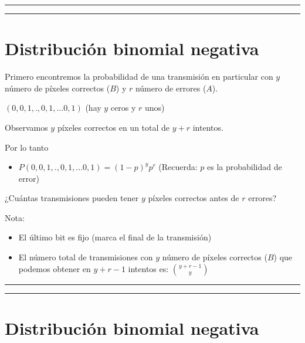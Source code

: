 \documentclass[
]{book}
\providecommand{\tightlist}{%
  \setlength{\itemsep}{0pt}\setlength{\parskip}{0pt}}
\begin{document}
\begin{center}\rule{0.5\linewidth}{0.5pt}\end{center}

\begin{center}\rule{0.5\linewidth}{0.5pt}\end{center}

\hypertarget{distribuciuxf3n-binomial-negativa-1}{%
\section{Distribución binomial negativa}\label{distribuciuxf3n-binomial-negativa-1}}

Primero encontremos la probabilidad de una transmisión en particular con \(y\) número de píxeles correctos (\(B\)) y \(r\) número de errores (\(A\)).

\((0,0,1,., 0,1,...0,1)\) (hay \(y\) ceros y \(r\) unos)

Observamos \(y\) píxeles correctos en un total de \(y + r\) intentos.

Por lo tanto

\begin{itemize}
\tightlist
\item
  \(P(0,0,1,., 0,1,...0,1)=(1-p)^yp^r\) (Recuerda: \(p\) es la probabilidad de error)
\end{itemize}

¿Cuántas transmisiones pueden tener \(y\) píxeles correctos antes de \(r\) errores?

Nota:

\begin{itemize}
\item
  El último bit es fijo (marca el final de la transmisión)
\item
  El número total de transmisiones con \(y\) número de píxeles correctos (\(B\)) que podemos obtener en \(y + r-1\) intentos es: \(\binom {y + r-1} y\)
\end{itemize}

\begin{center}\rule{0.5\linewidth}{0.5pt}\end{center}

\begin{center}\rule{0.5\linewidth}{0.5pt}\end{center}

\hypertarget{distribuciuxf3n-binomial-negativa-2}{%
\section{Distribución binomial negativa}\label{distribuciuxf3n-binomial-negativa-2}}
\end{document}
